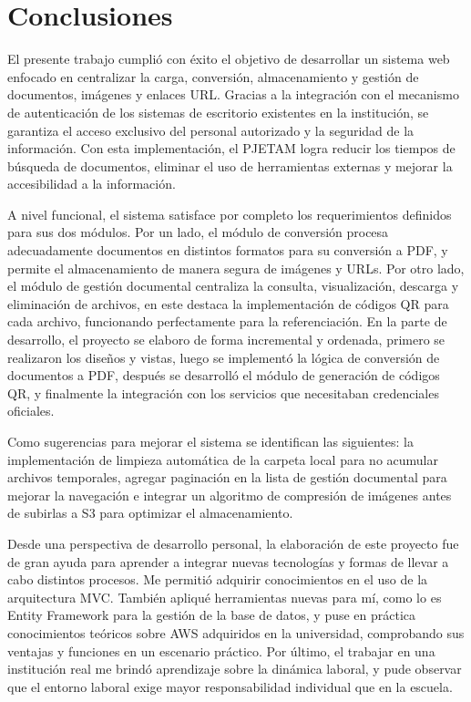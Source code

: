 \section{Conclusiones}
El presente trabajo cumplió con éxito el objetivo de desarrollar un sistema web enfocado en centralizar la carga, conversión, almacenamiento y gestión de documentos, imágenes y enlaces URL. Gracias a la integración con el mecanismo de autenticación de los sistemas de escritorio existentes en la institución, se garantiza el acceso exclusivo del personal autorizado y la seguridad de la información.
Con esta implementación, el PJETAM logra reducir los tiempos de búsqueda de documentos, eliminar el uso de herramientas externas y mejorar la accesibilidad a la información.

A nivel funcional, el sistema satisface por completo los requerimientos definidos para sus dos módulos. Por un lado, el módulo de conversión procesa adecuadamente documentos en distintos formatos para su conversión a PDF, y permite el almacenamiento de manera segura de imágenes y URLs. 
Por otro lado, el módulo de gestión documental centraliza la consulta, visualización, descarga y eliminación de archivos, en este destaca la implementación de códigos QR para cada archivo, funcionando perfectamente para la referenciación.
En la parte de desarrollo, el proyecto se elaboro de forma incremental y ordenada, primero se realizaron los diseños y vistas, luego se implementó la lógica de conversión de documentos a PDF, después se desarrolló el módulo de generación de códigos QR, y finalmente la integración con los servicios que necesitaban credenciales oficiales.

Como sugerencias para mejorar el sistema se identifican las siguientes: la implementación de limpieza automática de la carpeta local para no acumular archivos temporales, agregar paginación en la lista de gestión documental para mejorar la navegación e integrar un algoritmo de compresión de imágenes antes de subirlas a S3 para optimizar el almacenamiento.

Desde una perspectiva de desarrollo personal, la elaboración de este proyecto fue de gran ayuda para aprender a integrar nuevas tecnologías y formas de llevar a cabo distintos procesos. Me permitió adquirir conocimientos en el uso de la arquitectura MVC. También apliqué herramientas nuevas para mí, como lo es Entity Framework para la gestión de la base de datos,
y puse en práctica conocimientos teóricos sobre AWS adquiridos en la universidad, comprobando sus ventajas y funciones en un escenario práctico. Por último, el trabajar en una institución real me brindó aprendizaje sobre la dinámica laboral, y pude observar que el entorno laboral exige mayor responsabilidad individual que en la escuela.
